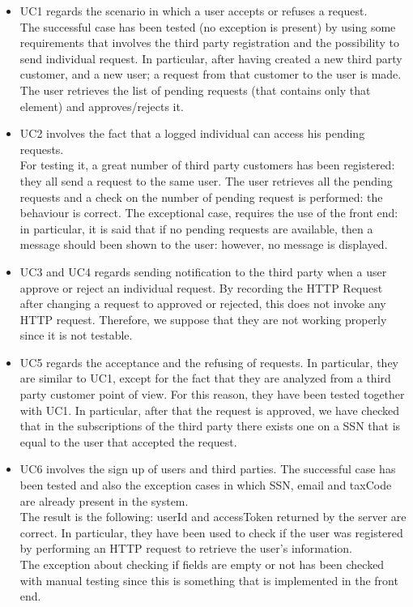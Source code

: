 \begin{itemize}
\item 
UC1 regards the scenario in which a user accepts or refuses a request. \\
The successful case has been tested (no exception is present) by using some requirements that involves the
third party registration and the possibility to send individual request. In particular, after having created a new third party customer,
and a new user; a request from that customer to the user is made. The user retrieves the list of pending requests (that contains only that
element) and approves/rejects it.

\item 
UC2 involves the fact that a logged individual can access his pending requests. \\
For testing it, a great number of third party customers has been registered: they all send a request to the same user.
The user retrieves all the pending requests and a check on the number of pending request is performed: the behaviour is correct.
The exceptional case, requires the use of the front end: in particular, it is said that if no pending requests are available, then a message
should been shown to the user: however, no message is displayed.

\item 
UC3 and UC4 regards sending notification to the third party when a user approve or reject an individual request. By recording the HTTP Request after changing a request to approved or rejected, this does not invoke any HTTP request. Therefore, we suppose that they are not working properly since it is not testable.

\item 
UC5 regards the acceptance and the refusing of requests. In particular, they are similar to UC1, except for the fact
that they are analyzed from a third party customer point of view. For this reason, they have been tested together with UC1. 
In particular, after that the request is approved, we have checked that in the subscriptions
of the third party there exists one on a SSN that is equal to the user that accepted the request.

\item UC6 involves the sign up of users and third parties. The successful case has been tested and also the exception cases in which SSN, email and taxCode
are already present in the system. \\
The result is the following: userId and accessToken returned by the server are correct. In particular, they have been used to check
if the user was registered by performing an HTTP request to retrieve the user's information.  \\
The exception about checking if fields are empty or not has been checked with manual testing since this is something that is implemented in the front
end.


\end{itemize}
